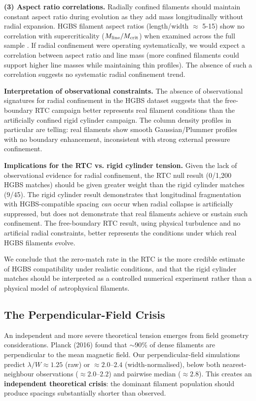 \documentclass[twocolumn,longtitle,usenatbib]{mnras}
\begin{document}
\textbf{(3) Aspect ratio correlations.}
Radially confined filaments should maintain constant aspect ratio during evolution as they add mass longitudinally without radial expansion. HGBS filament aspect ratios (length/width $\approx$ 5-15) show no correlation with supercriticality ($M_{\rm line}/M_{\rm crit}$) when examined across the full sample \citep{Arzoumanian2019}. If radial confinement were operating systematically, we would expect a correlation between aspect ratio and line mass (more confined filaments could support higher line masses while maintaining thin profiles). The absence of such a correlation suggests no systematic radial confinement trend.

\textbf{Interpretation of observational constraints.}
The absence of observational signatures for radial confinement in the HGBS dataset suggests that the free-boundary RTC campaign better represents real filament conditions than the artificially confined rigid cylinder campaign. The column density profiles in particular are telling: real filaments show smooth Gaussian/Plummer profiles with no boundary enhancement, inconsistent with strong external pressure confinement.

\textbf{Implications for the RTC vs. rigid cylinder tension.}
Given the lack of observational evidence for radial confinement, the RTC null result (0/1,200 HGBS matches) should be given greater weight than the rigid cylinder matches (9/45). The rigid cylinder result demonstrates that longitudinal fragmentation with HGBS-compatible spacing \textit{can} occur when radial collapse is artificially suppressed, but does not demonstrate that real filaments achieve or sustain such confinement. The free-boundary RTC result, using physical turbulence and no artificial radial constraints, better represents the conditions under which real HGBS filaments evolve.

We conclude that the zero-match rate in the RTC is the more credible estimate of HGBS compatibility under realistic conditions, and that the rigid cylinder matches should be interpreted as a controlled numerical experiment rather than a physical model of astrophysical filaments.

\subsection{The Perpendicular-Field Crisis}

An independent and more severe theoretical tension emerges from field geometry considerations. Planck (2016) found that $\sim$90\% of dense filaments are perpendicular to the mean magnetic field. Our perpendicular-field simulations predict $\lambda/W \approx 1.25$ (raw) or $\approx 2.0$--$2.4$ (width-normalised), below both nearest-neighbour observations ($\approx 2.0$--$2.2$) and pairwise median ($\approx 2.8$). This creates an \textbf{independent theoretical crisis}: the dominant filament population should produce spacings substantially shorter than observed.
\end{document}
